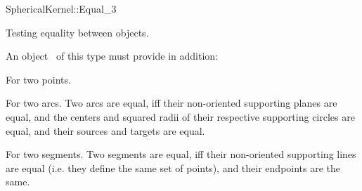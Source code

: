 \begin{ccRefFunctionObjectConcept}{SphericalKernel::Equal_3}

\ccDefinition

Testing equality between objects.

\ccRefines



An object \ccVar\ of this type must provide in addition:

{For two points.}

{For two arcs. Two arcs are equal, iff their non-oriented
  supporting planes are equal, and the centers and squared
  radii of their respective supporting circles are equal, and their
  sources and targets are equal.}


{For two segments. Two segments are equal, iff their non-oriented
  supporting lines are equal (i.e. they define the same set of
  points), and their endpoints are the same.}

\ccSeeAlso

\\
\\
\\
\\

\end{ccRefFunctionObjectConcept}
